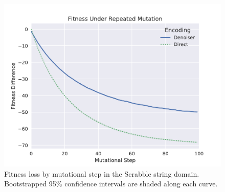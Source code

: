\begin{figure}
  \includegraphics[width=0.8\linewidth]{img/results/scrabble_fit_diff_vs_step}
  \caption{
    Fitness loss by mutational step in the Scrabble string domain.
    Bootstrapped 95\% confidence intervals are shaded along each curve.
    }\label{fig:scrabble_fit_diff_vs_step}
\end{figure}
